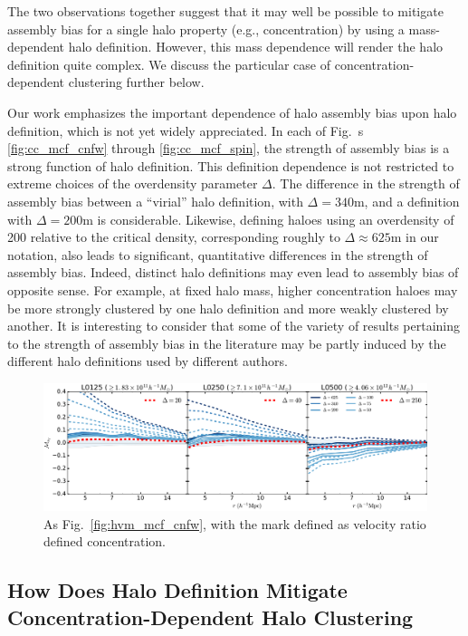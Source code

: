 \documentclass[usenatbib,fleqn]{mnras}
\begin{document}
The two observations together suggest that it may well be possible to mitigate assembly bias for a single halo property (e.g., concentration) by using a mass-dependent halo definition. However, this mass dependence will render the halo definition quite complex. We discuss the particular case of concentration-dependent clustering further below.

Our work emphasizes the important dependence of halo assembly bias upon halo definition, which is not yet widely appreciated. In each of Fig.~s \ref{fig:cc_mcf_cnfw} through \ref{fig:cc_mcf_spin}, the strength of assembly bias is a strong function of halo definition. This definition dependence is not restricted to extreme choices of the overdensity parameter $\Delta$. The difference in the strength of assembly bias between a ``virial'' halo definition, with $\Delta=340$m, and a definition with $\Delta=200$m is considerable. Likewise, defining haloes using an overdensity of 200 relative to the critical density, corresponding roughly to $\Delta \approx 625$m in our notation, also leads to significant, quantitative differences in the strength of assembly bias. Indeed, distinct halo definitions may even lead to assembly bias of opposite sense. For example, at fixed halo mass, higher concentration haloes may be more strongly clustered by one halo definition and more weakly clustered by another. It is interesting to consider that some of the variety of results pertaining to the strength of assembly bias in the literature may be partly induced by the different halo definitions used by different authors.

\begin{figure}
	\centering
	\includegraphics[width=\textwidth]{match_mcf_cV.pdf}
	\caption{As Fig.~\ref{fig:hvm_mcf_cnfw}, with the mark defined as velocity ratio defined concentration.
}
	\label{fig:hvm_mcf_cV}
\end{figure}

\subsection{How Does Halo Definition Mitigate Concentration-Dependent Halo Clustering}
\end{document}
